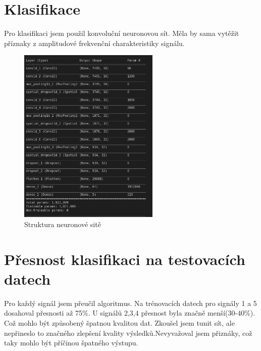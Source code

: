 \documentclass[a4paper,twoside,12pt]{article}
\begin{document}
\section{Klasifikace}
Pro klasifikaci jsem použil konvoluční neuronovou sít. Měla by sama vytěžit příznaky z amplitudové frekvenční charakteristiky signálu. 
\begin{figure}[H]
\begin{center}
\includegraphics[width=0.6\textwidth]{neuronka}
\caption{Struktura neuronové sitě}
\label{img:neuronka}
\end{center}
\end{figure}
\section{Přesnost klasifikaci na testovacích datech}
Pro každý signál jsem přeučil algoritmus. Na trénovacích datech pro signály 1 a 5 dosahoval přesnosti až 75\%. U signálů 2,3,4 přesnost byla značně menší(30-40\%). Což mohlo být způsobený špatnou kvalitou dat. Zkoušel jsem tunit sít, ale nepřineslo to značného zlepšení kvality výsledků.Nevyvažoval jsem přiznáky, což taky mohlo být příčinou špatného výstupu.

\clearpage
		\listoffigures 		%
		\clearpage
	
	\setlength{\parskip}{0.5cm}		%
		
	
\end{document}
